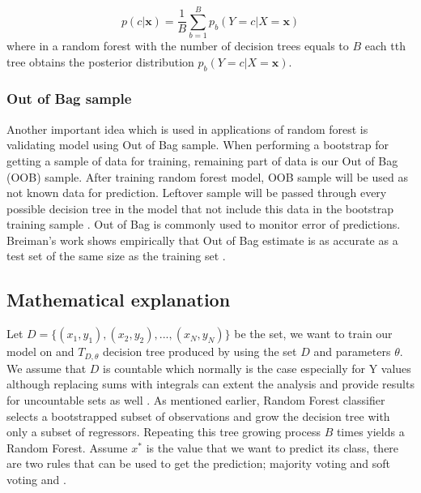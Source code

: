 \begin{equation}
	p(c|\textbf{x}) =  \frac{1}{B} \displaystyle\sum_{b=1}^{B} p_{b}(Y = c |X = \textbf{x})
\end{equation}
where in a random forest with the number of decision trees equals to $B$ each tth tree obtains the posterior 
distribution $ p_{b}(Y = c |X = \textbf{x}) $.

\subsubsection {Out of Bag sample}
Another important idea which is used in applications of random forest is validating model using Out of Bag sample.
When performing a bootstrap for getting a sample of data for training,
remaining part of data is our Out of Bag (OOB) sample.
After training random forest model, OOB sample will be used as not known data for prediction.
Leftover sample will be passed through every possible decision tree in the model that not include this
data in the bootstrap training sample \cite{friedman2001elements}. Out of Bag is commonly used to monitor error of predictions. 
Breiman’s work \cite{Breiman1996OUT-OF-BAG-E} shows empirically that Out of Bag estimate is as accurate 
as a test set of the same size as the training set \cite{Breiman1996OUT-OF-BAG-E}.


\subsection{Mathematical explanation}

Let $D = \{(x_{1},y_{1}), (x_{2}, y_{2}), ... , (x_{N}, y_{N})\}$ be the set, we want to train our model on and $T_{D, \theta}$ 
decision tree produced by using the set $D$ and parameters $\theta$. We assume that $D$ is countable which normally is the 
case especially for Y values although replacing sums with integrals can extent the analysis and 
provide results for uncountable sets as well \cite{kohavi1996bias}. As mentioned earlier, 
Random Forest classifier selects a bootstrapped subset of observations and 
grow the decision tree with only a subset of regressors. Repeating this tree growing process $B$ times 
yields a Random Forest. Assume $x^*$ is the value that we want to predict its class, 
there are two rules that can be used to get the prediction; majority voting and 
soft voting \cite{louppe2014understanding} and \cite{zhou2012ensemble}.

